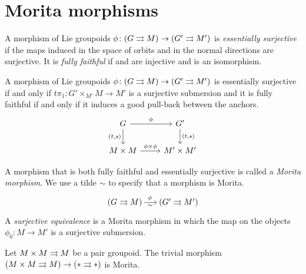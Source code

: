 %
%

\section{Morita morphisms}\label{sec:morita}

A morphism of Lie groupoids $\phi\colon(G\rightrightarrows M)\to(G'\rightrightarrows M')$ is \emph{essentially surjective} if the maps induced in the space of orbits  and in the normal directions  are surjective.
%
It is \emph{fully faithful} if  and  are injective and  is an isomorphism.

\begin{prop}\label{prop:dhfgpds}
A morphism of Lie groupoids $\phi\colon(G\rightrightarrows M)\to(G'\rightrightarrows M')$ is essentially surjective if and only if $t\pi_1\colon G'\times_{M'} M\to M'$ is a surjective submersion and it is fully faithful if and only if it induces a good pull-back between the anchors.
\begin{equation}
\begin{tikzcd}
 G \ar{r}{\phi} \ar{d}[swap]{(t, s)} & G' \ar{d}{(t, s)} \\
 M\times M \ar{r}{\phi\times\phi} & M'\times M'
\end{tikzcd}
\end{equation}
\end{prop}

A morphism that is both fully faithful and essentially surjective is called a \emph{Morita morphism}.
We use a tilde $\sim$ to specify that a morphism is Morita.
\[ \begin{tikzcd}[sep = small]
 (G\tto M) \ar[shorten = -.15em]{r}[pos=.45, sloped, below]{\sim}[pos=.45, sloped, above]{\phi} & (G'\tto M')
\end{tikzcd} \]
%
A \emph{surjective equivalence} is a Morita morphism in which the map on the objects $\phi_0\colon M\to M'$ is a surjective submersion.

\begin{example}
Let $M\times M\rightrightarrows M$ be a pair groupoid.
The trivial morphism $(M\times M\rightrightarrows M) \to (*\rightrightarrows *)$ is Morita.
\end{example}

